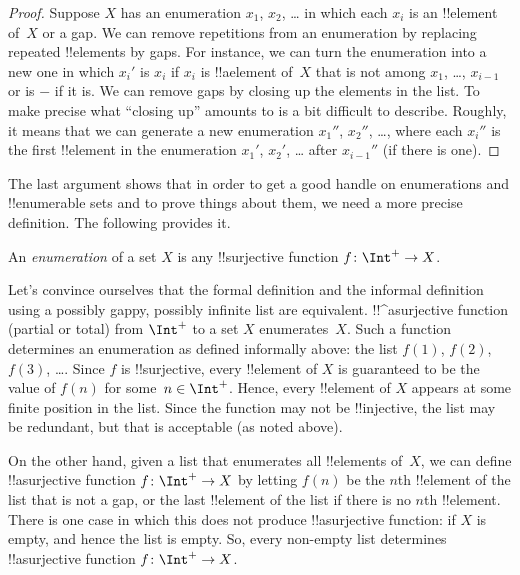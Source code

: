 \documentclass[../../../include/open-logic-section]{subfiles}
\begin{document}
\begin{proof}
  Suppose $X$ has an enumeration $x_1$, $x_2$, \dots{} in which each
  $x_i$ is an !!{element} of~$X$ or a gap.  We can remove repetitions
  from an enumeration by replacing repeated !!{element}s by gaps. For
  instance, we can turn the enumeration into a new one in which $x_i'$
  is $x_i$ if $x_i$ is !!a{element} of~$X$ that is not among $x_1$,
  \dots, $x_{i-1}$ or is $-$ if it is. We can remove gaps by closing
  up the elements in the list. To make precise what ``closing up''
  amounts to is a bit difficult to describe. Roughly, it means that we
  can generate a new enumeration $x_1''$, $x_2''$, \dots, where each
  $x_i''$ is the first !!{element} in the enumeration $x_1'$, $x_2'$,
  \dots{} after $x_{i-1}''$ (if there is one).
\end{proof}

The last argument shows that in order to get a good handle on
enumerations and !!{enumerable} sets and to prove things about them,
we need a more precise definition.  The following provides it.

\begin{defn}[Enumeration]
An \emph{enumeration} of a set $X$ is any !!{surjective} function
$f \colon \Int^+ \to X$.
\end{defn}

\begin{explain}
Let's convince ourselves that the formal definition and the informal
definition using a possibly gappy, possibly infinite list are
equivalent. !!^a{surjective} function (partial or total) from $\Int^+$
to a set $X$ enumerates~$X$. Such a function determines an enumeration
as defined informally above: the list $f(1)$, $f(2)$, $f(3)$,
\dots. Since $f$ is !!{surjective}, every !!{element} of $X$ is
guaranteed to be the value of $f(n)$ for some~$n \in \Int^+$. Hence,
every !!{element} of $X$ appears at some finite position in the
list. Since the function may not be !!{injective}, the list may be
redundant, but that is acceptable (as noted above).

On the other hand, given a list that enumerates all !!{element}s
of~$X$, we can define !!a{surjective} function $f\colon \Int^+ \to X$ by
letting $f(n)$ be the $n$th !!{element} of the list that is not a gap,
or the last !!{element} of the list if there is no $n$th !!{element}.
There is one case in which this does not produce !!a{surjective}
function: if $X$ is empty, and hence the list is empty. So, every
non-empty list determines !!a{surjective} function $f\colon \Int^+ \to
X$.
\end{explain}
\end{document}
